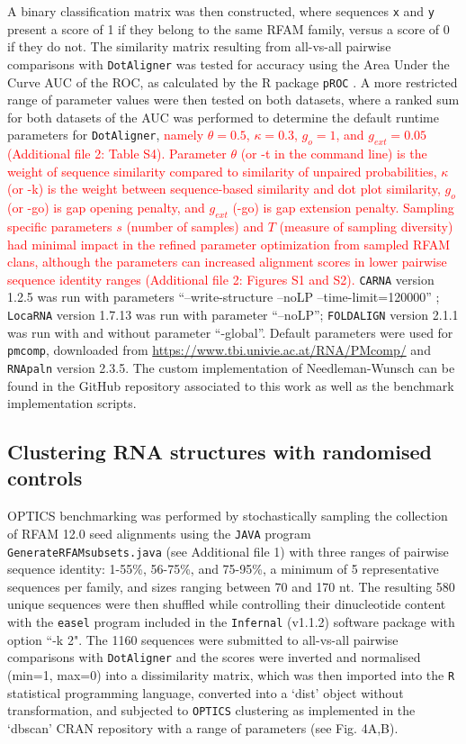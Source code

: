 \documentclass{bmcart}
\newcommand\dotaligner{\texttt{DotAligner}}
\newcommand\locarna{\texttt{LocaRNA}}
\newcommand\foldalign{\texttt{FOLDALIGN}}
\newcommand\carna{\texttt{CARNA}}
\begin{document}
A binary classification matrix was then constructed, where sequences \texttt{x} and \texttt{y}
present a score of 1 if they belong to the same RFAM family, versus a score of 0 if they do not. 
The similarity matrix resulting from all-vs-all pairwise comparisons with \dotaligner{} was tested for 
accuracy using the Area Under the Curve AUC of the ROC, as calculated by the R package \texttt{pROC} \cite{robin2011proc}. 
A more restricted range of parameter values were then tested on both datasets, where a ranked sum for both datasets of the AUC was performed to determine the default runtime parameters for \dotaligner, 
\textcolor{red}{
namely $\theta=0.5$, $\kappa=0.3$, $g_o=1$, and $g_{ext}=0.05$ (Additional file 2: Table S4). Parameter $\theta$ (or -t in the command line) is the weight of sequence similarity compared to similarity of unpaired probabilities, $\kappa$ (or -k) is the weight between sequence-based similarity and dot plot similarity, $g_o$ (or -go) is gap opening penalty, and $g_{ext}$ (-go) is gap extension penalty.
Sampling specific parameters $s$ (number of samples) and $T$ (measure of sampling diversity) had minimal impact 
in the refined parameter optimization from sampled RFAM clans, although the parameters can increased alignment scores in lower pairwise sequence identity ranges (Additional file 2: Figures S1 and S2).}
\carna{} version 1.2.5 was run with parameters ``--write-structure --noLP --time-limit=120000'' ;  \locarna{} version 1.7.13 was run with parameter ``--noLP''; \foldalign{} version 2.1.1 was run with and without parameter ``-global''. Default parameters were used for \texttt{pmcomp}, downloaded from \url{https://www.tbi.univie.ac.at/RNA/PMcomp/} and \texttt{RNApaln} version 2.3.5. The custom implementation of Needleman-Wunsch can be found in the GitHub repository associated to this work as well as the benchmark implementation scripts. \\

\subsection*{Clustering RNA structures with randomised controls}
OPTICS benchmarking was performed by stochastically sampling the collection of RFAM 12.0 
seed alignments using the \texttt{JAVA} program \texttt{GenerateRFAMsubsets.java} (see Additional file 1) with three ranges of pairwise sequence identity: 1-55\%, 56-75\%, and 75-95\%, a minimum of 5 representative sequences per family, and sizes ranging between 70 and 170 nt.   
The resulting 580 unique sequences were then shuffled while controlling their dinucleotide content with 
the \texttt{easel} program included in the \texttt{Infernal} (v1.1.2) software package 
\cite{nawrocki2013infernal} with option ``-k 2". The 1160 sequences were submitted to 
all-vs-all pairwise comparisons with \dotaligner{} and the scores were inverted and 
normalised (min=1, max=0) into a dissimilarity matrix, which was then imported into
the \texttt{R} statistical programming language, converted into a `dist' object without
transformation, and subjected to \texttt{OPTICS} clustering as implemented
in the `dbscan' CRAN repository with a range of parameters (see Fig. 4A,B).\\
\end{document}
